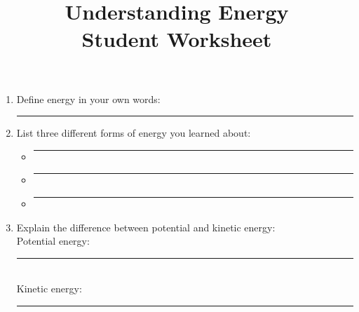 \documentclass[11pt]{article}
\title{Understanding Energy\\[0.5em]\large Student Worksheet}
\author{}
\date{}
\begin{document}
\maketitle
\thispagestyle{fancy}

\begin{conceptbox}
\begin{enumerate}[label=\arabic*., itemsep=8pt]
\item Define energy in your own words:\\
\rule{\textwidth}{0.5pt}

\item List three different forms of energy you learned about:
\begin{itemize}[label=$\square$]
\item \rule{0.8\textwidth}{0.5pt}
\item \rule{0.8\textwidth}{0.5pt}
\item \rule{0.8\textwidth}{0.5pt}
\end{itemize}

\item Explain the difference between potential and kinetic energy:\\
Potential energy: \rule{0.75\textwidth}{0.5pt}\\[4pt]
Kinetic energy: \rule{0.77\textwidth}{0.5pt}
\end{enumerate}
\end{conceptbox}

\vspace{1em}
\end{document}
